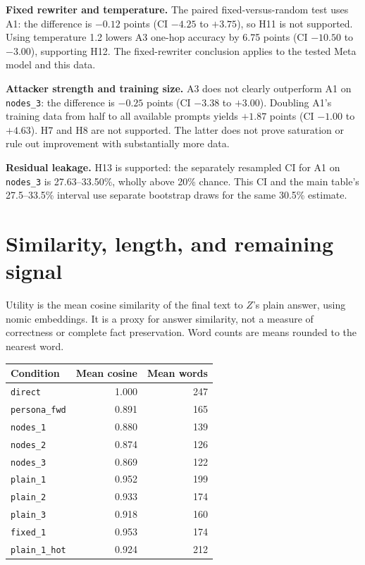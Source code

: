 \documentclass[11pt]{article}
\newcommand{\cond}[1]{\texttt{#1}}
\begin{document}
\textbf{Fixed rewriter and temperature.} The paired fixed-versus-random test
uses A1: the difference is $-0.12$ points (CI $-4.25$ to $+3.75$), so H11 is
not supported. Using temperature 1.2 lowers A3 one-hop accuracy by 6.75 points
(CI $-10.50$ to $-3.00$), supporting H12. The fixed-rewriter conclusion applies
to the tested Meta model and this data.

\textbf{Attacker strength and training size.} A3 does not clearly outperform
A1 on \cond{nodes\_3}: the difference is $-0.25$ points (CI $-3.38$ to
$+3.00$). Doubling A1's training data from half to all available prompts yields
$+1.87$ points (CI $-1.00$ to $+4.63$). H7 and H8 are not supported. The latter
does not prove saturation or rule out improvement with substantially more data.

\textbf{Residual leakage.} H13 is supported: the separately resampled CI for
A1 on \cond{nodes\_3} is 27.63--33.50\%, wholly above 20\% chance. This CI
and the main table's 27.5--33.5\% interval use separate bootstrap draws for
the same 30.5\% estimate.

\clearpage
\section{Similarity, length, and remaining signal}
Utility is the mean cosine similarity of the final text to $Z$'s plain answer,
using nomic embeddings. It is a proxy for answer similarity, not a measure of
correctness or complete fact preservation. Word counts are means rounded to
the nearest word.
\begin{center}
\small
\begin{tabular}{lrr}
\toprule
Condition & Mean cosine & Mean words \\
\midrule
\texttt{direct} & 1.000 & 247 \\
\texttt{persona\_fwd} & 0.891 & 165 \\
\texttt{nodes\_1} & 0.880 & 139 \\
\texttt{nodes\_2} & 0.874 & 126 \\
\texttt{nodes\_3} & 0.869 & 122 \\
\texttt{plain\_1} & 0.952 & 199 \\
\texttt{plain\_2} & 0.933 & 174 \\
\texttt{plain\_3} & 0.918 & 160 \\
\texttt{fixed\_1} & 0.953 & 174 \\
\texttt{plain\_1\_hot} & 0.924 & 212 \\
\bottomrule
\end{tabular}
\end{center}
\end{document}
